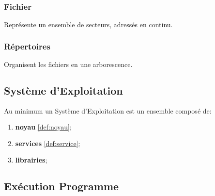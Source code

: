 \documentclass{article}
\begin{document}
\subsubsection{Fichier}
\begin{definition}\label{def:fichiers}
    Représente un ensemble de secteurs, adressés en continu. 
\end{definition}

\subsubsection{Répertoires}
\begin{definition}\label{def:repertoires}
    Organisent les fichiers en une arborescence.
\end{definition}


\subsection{Système d'Exploitation}
\begin{definition}\label{def:systemeExploitation}
    Au minimum un Système d'Exploitation est un ensemble composé de:
    \begin{enumerate}[noitemsep]
        \item \textbf{noyau} \ref{def:noyau};
        \item \textbf{services} \ref{def:service};
        \item \textbf{librairies};
    \end{enumerate}
\end{definition}


\subsection{Exécution Programme}
\end{document}
